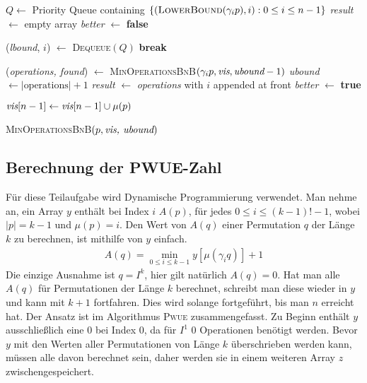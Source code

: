 \documentclass[a4paper, 10pt, ngerman]{article}
\begin{document}
\begin{algorithm}
    {
         \;
    }
    {
         \;
    }

    $Q \gets$ Priority Queue containing $\{(\textsc{LowerBound}(\gamma_i p), i) : 0 \le i \le n - 1\}$ \;
    \emph{result} $\gets$ empty array \;
    \emph{better} $\gets$ \textbf{false} \;

    {
        (\emph{lbound}, $i$) $\gets$ \textsc{Dequeue}$(Q)$ \;
        {
            \textbf{break} \;
        }

        (\emph{operations, found}) $\gets$ \textsc{MinOperationsBnB}$(\gamma_i p, \emph{vis}, \emph{ubound} - 1)$ \;
        {
            \emph{ubound} $\gets |\text{operations}| + 1$ \;
            \emph{result} $\gets$ \emph{operations} with $i$ appended at front \;
            \emph{better} $\gets$ \textbf{true} \;
        }
    }

    $\emph{vis}[n - 1] \gets \emph{vis}[n - 1] \cup \mu(p)$ \;
     \;

    \caption{\textsc{MinOperationsBnB}$(p, \emph{vis, ubound})$}
\end{algorithm}

\subsection{Berechnung der PWUE-Zahl}

Für diese Teilaufgabe wird Dynamische Programmierung verwendet. Man nehme an, ein Array $y$ enthält bei Index $i$ $A(p)$, für jedes $0 \le i \le (k - 1)! - 1$, wobei $|p| = k - 1$ und $\mu(p) = i$. Den Wert von $A(q)$ einer Permutation $q$ der Länge $k$ zu berechnen, ist mithilfe von $y$ einfach.
\begin{align*}
    A(q) = \min_{0 \le i \le k - 1}  y[\mu(\gamma_i q)] + 1
\end{align*}
Die einzige Ausnahme ist $q = I^k$, hier gilt natürlich $A(q) = 0$. Hat man alle $A(q)$ für Permutationen der Länge $k$ berechnet, schreibt man diese wieder in $y$ und kann mit $k + 1$ fortfahren. Dies wird solange fortgeführt, bis man $n$ erreicht hat. Der Ansatz ist im Algorithmus \textsc{Pwue} zusammengefasst. Zu Beginn enthält $y$ ausschließlich eine 0 bei Index 0, da für $I^1$ 0 Operationen benötigt werden. Bevor $y$ mit den Werten aller Permutationen von Länge $k$ überschrieben werden kann, müssen alle davon berechnet sein, daher werden sie in einem weiteren Array $z$ zwischengespeichert.
\end{document}
